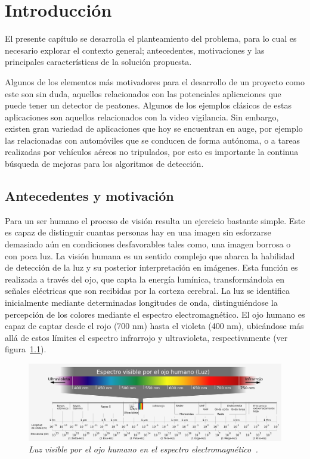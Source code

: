 \chapter{Introducci\'on}
\label{cap:intro}

El presente capítulo se desarrolla el planteamiento del problema, para lo cual es necesario explorar el contexto general; antecedentes, motivaciones y las principales características de la solución propuesta.

Algunos de los elementos más motivadores para el desarrollo de un proyecto como este son sin duda, aquellos relacionados con las potenciales aplicaciones que puede tener un detector de peatones. Algunos de los ejemplos clásicos de estas aplicaciones son aquellos relacionados con la video vigilancia. Sin embargo, existen gran variedad de aplicaciones que hoy se encuentran en auge, por ejemplo las relacionadas con automóviles que se conducen de forma autónoma, o a tareas realizadas por vehículos aéreos no tripulados, por esto es importante la continua búsqueda de mejoras para los algoritmos de detección.

\section{Antecedentes y motivación}
\label{intro:motivacion}

Para un ser humano el proceso de visión resulta un ejercicio bastante simple. Este es capaz de distinguir cuantas personas hay en una imagen sin esforzarse demasiado aún en condiciones desfavorables tales como, una imagen borrosa o con poca luz. La visión humana es un sentido complejo que abarca la habilidad de detección de la luz y su posterior interpretación en imágenes. Esta función es realizada a través del ojo, que capta la energía lumínica, transformándola en señales eléctricas que son recibidas por la corteza cerebral.
La luz se identifica inicialmente mediante determinadas longitudes de onda, distinguiéndose la percepción de los colores mediante el espectro electromagnético. El ojo humano es capaz de captar desde el rojo (700 nm) hasta el violeta (400 nm), ubicándose más allá de estos límites el espectro infrarrojo y ultravioleta, respectivamente (ver figura~\ref{fig:espectro}).

\begin{figure}[htc]
  \centering
  \includegraphics[scale=.3]{images/espectro}
  \caption{\em Luz visible por el ojo humano en el espectro electromagnético~\citep{Horst2006}. }  
  \label{fig:espectro}
\end{figure}

